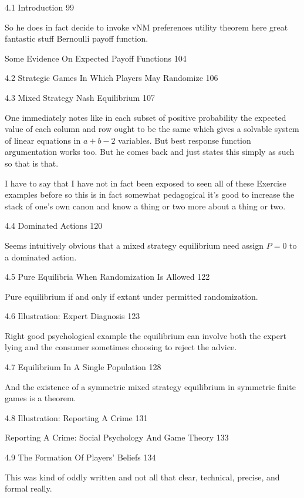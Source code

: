 4.1 Introduction 99

So he does in fact decide to invoke vNM preferences utility theorem here great fantastic stuff Bernoulli payoff function.

Some Evidence On Expected Payoff Functions 104



4.2 Strategic Games In Which Players May Randomize 106



4.3 Mixed Strategy Nash Equilibrium 107

One immediately notes like in each subset of positive probability the expected value of each column and row ought to be the same which gives a solvable system of linear equations in $a+b-2$ variables. But best response function argumentation works too. But he comes back and just states this simply as such so that is that.

I have to say that I have not in fact been exposed to seen all of these Exercise examples before so this is in fact somewhat pedagogical it's good to increase the stack of one's own canon and know a thing or two more about a thing or two.

4.4 Dominated Actions 120

Seems intuitively obvious that a mixed strategy equilibrium need assign $P=0$ to a dominated action.

4.5 Pure Equilibria When Randomization Is Allowed 122

Pure equilibrium if and only if extant under permitted randomization.

4.6 Illustration: Expert Diagnosis 123

Right good psychological example the equilibrium can involve both the expert lying and the consumer sometimes choosing to reject the advice.

4.7 Equilibrium In A Single Population 128

And the existence of a symmetric mixed strategy equilibrium in symmetric finite games is a theorem.

4.8 Illustration: Reporting A Crime 131



Reporting A Crime: Social Psychology And Game Theory 133



4.9 The Formation Of Players' Beliefs 134

This was kind of oddly written and not all that clear, technical, precise, and formal really.

